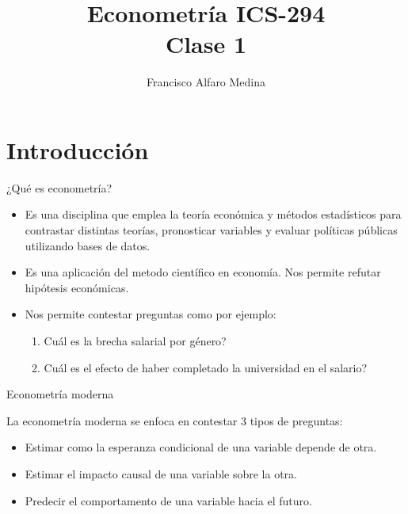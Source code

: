 \documentclass{beamer}
\title[ICS-162]{Econometría ICS-294\\ \small{Clase 1}}
\author{Francisco Alfaro Medina}
\institute[USM]
{Universidad Técnica Federico Santa María\\ %
	\medskip
	\textit{} %
	
}
\date{}
\begin{document}
	
\begin{frame}
	\titlepage %

\end{frame}
\section{Introducción}
\begin{frame}{¿Qué es econometría?}
 \begin{itemize}
     \item  Es una disciplina que emplea la teor\'ia econ\'omica y m\'etodos estad\'isticos para
contrastar distintas teor\'ias, pronosticar variables y evaluar pol\'iticas p\'ublicas
utilizando bases de datos.
\item  Es una aplicaci\'on del metodo cient\'ifico en econom\'ia. Nos permite refutar
hip\'otesis econ\'omicas.
\item  Nos permite contestar preguntas como por ejemplo:
\begin{enumerate}
    \item Cu\'al es la brecha salarial por g\'enero?
    \item Cu\'al es el efecto de haber completado la universidad en el salario?
\end{enumerate}

 \end{itemize}
 
\end{frame}


\begin{frame}{Econometría moderna}


  La econometr\'ia moderna se enfoca en contestar 3 tipos de preguntas:
  \begin{itemize}
      \item Estimar como la esperanza condicional de una variable depende de otra.
      \item Estimar el impacto causal de una variable sobre la otra.
      \item Predecir el comportamento de una variable hacia el futuro.
  \end{itemize}

\end{frame}
\end{document}
